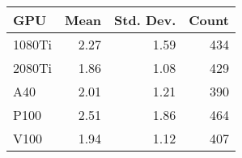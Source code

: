 \begin{tabular}{lrrr}
\toprule
GPU & Mean & Std. Dev. & Count \\
\midrule\midrule
1080Ti & 2.27 & 1.59 & 434 \\
2080Ti & 1.86 & 1.08 & 429 \\
A40 & 2.01 & 1.21 & 390 \\
P100 & 2.51 & 1.86 & 464 \\
V100 & 1.94 & 1.12 & 407 \\
\bottomrule
\end{tabular}
